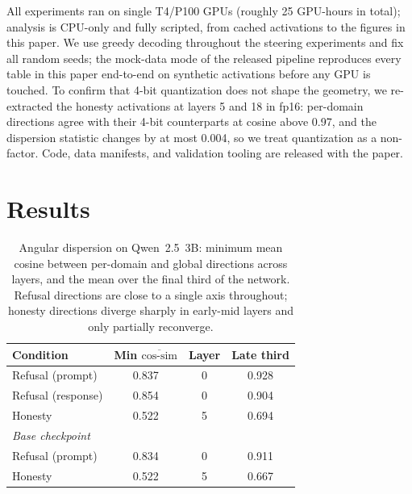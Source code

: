 \documentclass[11pt]{article}
\newcommand{\cosim}{\text{cos-sim}}
\begin{document}
All experiments ran on single T4/P100 GPUs (roughly 25 GPU-hours in total);
analysis is CPU-only and fully scripted, from cached activations to the
figures in this paper. We use greedy decoding throughout the steering
experiments and fix all random seeds; the mock-data mode of the released
pipeline reproduces every table in this paper end-to-end on synthetic
activations before any GPU is touched. To confirm that 4-bit quantization
does not shape the geometry, we re-extracted the honesty activations at
layers 5 and 18 in fp16: per-domain directions agree with their 4-bit
counterparts at cosine above 0.97, and the dispersion statistic changes
by at most 0.004, so we treat quantization as a non-factor. Code, data
manifests, and validation tooling are released with the paper.


\section{Results}
\label{sec:results}


\begin{table}[t]
  \centering
  \small
  \begin{tabular}{lccc}
    \toprule
    \textbf{Condition} & \textbf{Min $\overline{\cosim}$} & \textbf{Layer} & \textbf{Late third} \\
    \midrule
    Refusal (prompt)    & 0.837 & 0  & 0.928 \\
    Refusal (response)  & 0.854 & 0  & 0.904 \\
    Honesty             & 0.522 & 5  & 0.694 \\
    \midrule
    \multicolumn{4}{l}{\textit{Base checkpoint}} \\
    Refusal (prompt)    & 0.834 & 0  & 0.911 \\
    Honesty             & 0.522 & 5  & 0.667 \\
    \bottomrule
  \end{tabular}
  \caption{Angular dispersion on Qwen~2.5~3B: minimum mean cosine between
  per-domain and global directions across layers, and the mean over the final
  third of the network. Refusal directions are close to a single axis
  throughout; honesty directions diverge sharply in early-mid layers and only
  partially reconverge.}
  \label{tab:dispersion}
\end{table}
\end{document}

